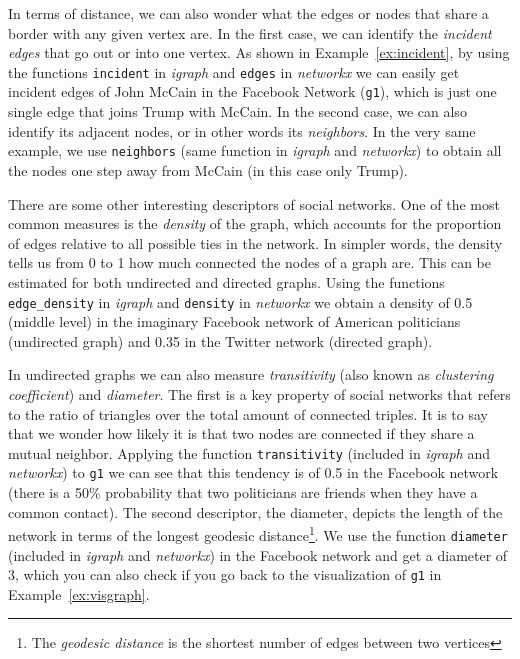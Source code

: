 
In terms of distance, we can also wonder what  the edges or nodes that share a border with any given vertex are. In the first case, we can identify the \emph{incident edges} that go out or into one vertex. As shown in Example~\ref{ex:incident}, by using the functions \texttt{incident} in \emph{igraph} and \texttt{edges} in \emph{networkx} we can easily get incident edges of John McCain in the Facebook Network (\texttt{g1}), which is just one single edge that joins Trump with McCain. In the second case, we can also identify its adjacent nodes, or in other words its \emph{neighbors}. In the very same example, we use \texttt{neighbors} (same function in \emph{igraph} and \emph{networkx}) to obtain all the nodes one step away from McCain (in this case only Trump).


There are some other interesting descriptors of social networks. One of the most common measures is the \emph{density} of the graph, which accounts for the proportion of edges relative to all possible ties in the network. In simpler words, the density tells us from 0 to 1 how much connected the nodes of a graph are. This can be estimated for both undirected and directed graphs. Using the functions \texttt{edge\_density} in \emph{igraph} and \texttt{density} in \emph{networkx} we obtain a density of 0.5 (middle level) in the imaginary Facebook network of American politicians (undirected graph) and 0.35 in the Twitter network (directed graph).

In undirected graphs we can also measure \emph{transitivity} (also known as \emph{clustering coefficient}) and \emph{diameter}. The first is a key property of social networks that refers to the ratio of triangles over the total amount of connected triples. It is to say that we wonder how likely it is that two nodes are connected if they share a mutual neighbor. Applying the function \texttt{transitivity} (included in \emph{igraph} and \emph{networkx}) to \texttt{g1} we can see that this tendency is of 0.5 in the Facebook network (there is a 50\% probability that two politicians
are friends when they have a common contact). The second descriptor, the diameter, depicts the length of the network in terms of the longest geodesic distance\footnote{The \emph{geodesic distance} is the shortest number of edges between two vertices}. We use the function \texttt{diameter} (included in \emph{igraph} and \emph{networkx}) in the Facebook network and get a diameter of 3, which you can also check if you go back to the visualization of \texttt{g1} in Example~\ref{ex:visgraph}.

